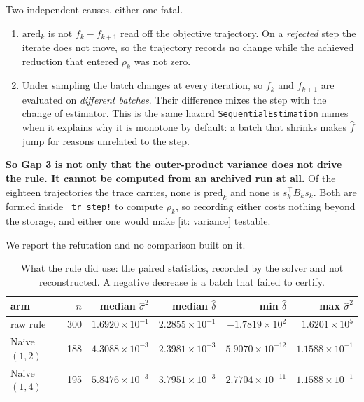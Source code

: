 \documentclass[11pt,a4paper]{article}
\begin{document}
Two independent causes, either one fatal.

\begin{enumerate}[leftmargin=2em]
  \item $\mathrm{ared}_k$ is not $f_k - f_{k+1}$ read off the objective
    trajectory. On a \emph{rejected} step the iterate does not move, so the
    trajectory records no change while the achieved reduction that entered
    $\rho_k$ was not zero.
  \item Under sampling the batch changes at every iteration, so $f_k$ and
    $f_{k+1}$ are evaluated on \emph{different batches}. Their difference mixes
    the step with the change of estimator. This is the same hazard
    \texttt{SequentialEstimation} names when it explains why it is monotone by
    default: a batch that shrinks makes $\hat f$ jump for reasons unrelated to the
    step.
\end{enumerate}

\textbf{So Gap 3 is not only that the outer-product variance does not drive the
rule. It cannot be computed from an archived run at all.} Of the eighteen
trajectories the trace carries, none is $\mathrm{pred}_k$ and none is
$s_k^{\!\top}B_ks_k$. Both are formed inside \texttt{\_tr\_step!} to compute
$\rho_k$, so recording either costs nothing beyond the storage, and either one
would make \ref{it: variance} testable.

We report the refutation and no comparison built on it.

\begin{table}[H]
  \centering\small
  \caption{What the rule did use: the paired statistics, recorded by the solver
    and not reconstructed. A negative decrease is a batch that failed to certify.}
  \label{tab: paired}
  \begin{tabular}{lrrrrr}
    \toprule
    arm & $n$ & median $\hat\sigma^2$ & median $\hat\delta$
      & min $\hat\delta$ & max $\hat\sigma^2$ \\
    \midrule
    raw rule     & 300 & $1.6920\times10^{-1}$ & $2.2855\times10^{-1}$
      & $-1.7819\times10^{2}$ & $1.6201\times10^{5}$ \\
    Naive$(1,2)$ & 188 & $4.3088\times10^{-3}$ & $2.3981\times10^{-3}$
      & $5.9070\times10^{-12}$ & $1.1588\times10^{-1}$ \\
    Naive$(1,4)$ & 195 & $5.8476\times10^{-3}$ & $3.7951\times10^{-3}$
      & $2.7704\times10^{-11}$ & $1.1588\times10^{-1}$ \\
    \bottomrule
  \end{tabular}
\end{table}
\end{document}
